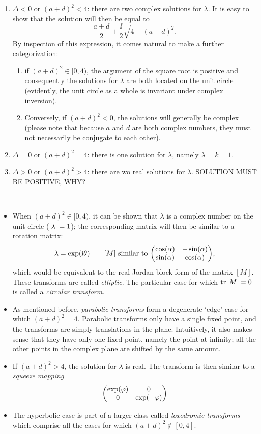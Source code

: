 \begin{enumerate}
    \item \(\Delta < 0\) or \((a + d)^2 < 4\): there are two complex solutions for \(\lambda\). It is easy to show that the solution will then be equal to 
        \[\frac{a + d}{2} \pm \frac{\ii}{2}\sqrt{4 - (a + d)^2}.\] 
        By inspection of this expression, it comes natural to make a further categorization: 
        \begin{enumerate}
            \item if \((a + d)^2 \in [0, 4)\), the argument of the square root is positive and consequently the solutions for \(\lambda\) are both located on the unit circle (evidently, the unit circle as a whole is invariant under complex inversion).
            \item Conversely, if \((a + d)^2 < 0\), the solutions will generally be complex (please note that because \(a\) and \(d\) are both complex numbers, they must not necessarily be conjugate to each other).
        \end{enumerate}
    \item \(\Delta = 0\) or \((a + d)^2 = 4\): there is one solution for \(\lambda\), namely \(\lambda = k = 1\).
    \item \(\Delta > 0\) or \((a + d)^2 > 4\): there are wo real solutions for \(\lambda\). SOLUTION MUST BE POSITIVE, WHY?
\end{enumerate}
\\
\begin{itemize}
    \item When \((a + d)^2 \in [0, 4)\), it can be shown that \(\lambda\) is a complex number on the unit circle (\(\abs{\lambda} = 1\)); the corresponding matrix will then be similar to a rotation matrix:
        \[ \lambda = \exp(\ii \theta) \qquad [M] \text{ similar to } \mqty(\cos(\alpha) & -\sin(\alpha) \\ \sin(\alpha) & \cos(\alpha)), \]
        which would be equivalent to the real Jordan block form of the matrix \([M]\). These transforms are called \emph{elliptic}. The particular case for which \(\trace{[M]} = 0\) is called a \emph{circular transform}.
    \item As mentioned before, \emph{parabolic transforms} form a degenerate `edge' case for which \((a + d)^2 = 4\). Parabolic transforms only have a single fixed point, and the transforms are simply translations in the plane. Intuitively, it also makes sense that they have only one fixed point, namely the point at infinity; all the other points in the complex plane are shifted by the same amount.
    \item If \((a + d)^2 > 4\), the solution for \(\lambda\) is real. The transform is then similar to a \emph{squeeze mapping}
        \[ \mqty(\dmat[0]{\exp(\varphi), \exp(-\varphi)}) \]
    \item The hyperbolic case is part of a larger class called \emph{loxodromic transforms} which comprise all the cases for which \((a + d)^2 \notin [0, 4]\).
\end{itemize}

